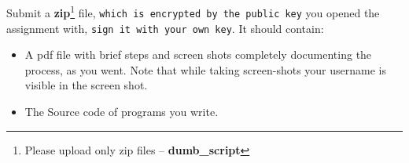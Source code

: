 \documentclass[11pt]{article}
\begin{document}
 \\\\
\noindent Submit a \textbf{zip}\footnote{ Please upload only zip files -- \textbf{dumb\_script}} file, \texttt{which is encrypted by the public key} you opened the assignment with, \texttt{sign it with your own key}. It should contain: 
\begin{itemize}
    \item  A pdf file with brief steps and screen shots completely documenting the process, as you went. Note that while taking screen-shots your username is visible in the screen shot.
    \item  The Source code of programs you write. 
    
    \end{itemize}
\end{document}

